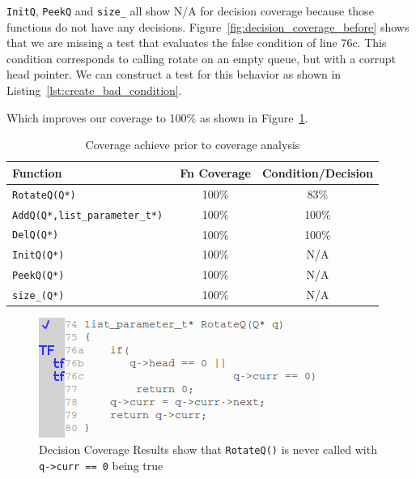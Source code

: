 \documentclass[12pt,journal]{article}
\begin{document}
{\tt InitQ}, {\tt PeekQ} and {\tt size\_} all show N/A for decision coverage
because those functions do not have any decisions.
Figure~\ref{fig:decision_coverage_before} shows that we are missing a test that
evaluates the false condition of line 76c. This condition corresponds to calling
rotate on an empty queue, but with a corrupt head pointer. We can construct
a test for this behavior as shown in Listing~\ref{lst:create_bad_condition}.



Which improves our coverage to 100\% as shown in Figure~\ref{fig:improved_coverage}.

\begin{table}
    \centering
    \caption{Coverage achieve prior to coverage analysis}
    \label{tab:before_coverage}
    \begin{tabular}{ l | c | c}
        \hline
        Function & Fn Coverage & Condition/Decision  \\
        \hline \hline 
        \tt{RotateQ(Q*)}	& 100\%	 & 83\%	 \\
        \tt{AddQ(Q*,list\_parameter\_t*)} &	100\% & 100\%	\\
        \tt{DelQ(Q*)}	& 100\% & 100\% \\	
        \tt{InitQ(Q*)}	& 100\% & N/A \\	
        \tt{PeekQ(Q*)}	& 100\% & N/A \\	
        \tt{size\_(Q*)}	& 100\% & N/A \\	
        \hline
    \end{tabular}
\end{table}

\begin{figure}
    \centering
    \includegraphics[width=0.8\columnwidth]{improved_decision_coverage.png}
    \caption{Decision Coverage Results show that {\tt RotateQ()} is never called
    with {\tt q->curr == 0} being true}
    \label{fig:improved_coverage}
\end{figure}
\end{document}
